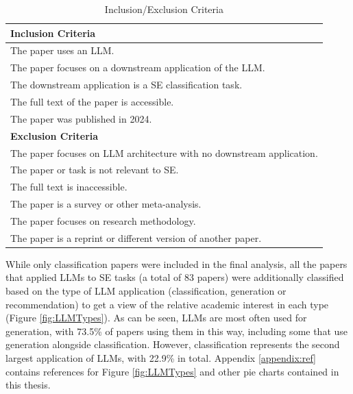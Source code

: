 \documentclass[a4paper]{article}
\begin{document}
\begin{table}[H]
	\caption{Inclusion/Exclusion Criteria}
	\begin{tabularx}{\textwidth}{|X|} \hline
		\textbf{Inclusion Criteria} \\ \hline
		The paper uses an LLM.  \\
		The paper focuses on a downstream application of the LLM. \\
		The downstream application is a SE classification task. \\
		The full text of the paper is accessible. \\
		The paper was published in 2024. \\ \hline
		\textbf{Exclusion Criteria} \\ \hline
		The paper focuses on LLM architecture with no downstream application. \\
		The paper or task is not relevant to SE. \\
		The full text is inaccessible. \\
		The paper is a survey or other meta-analysis. \\
		The paper focuses on research methodology. \\
		The paper is a reprint or different version of another paper. \\ \hline
	\end{tabularx}
	
	\label{table:criteria}
\end{table}

While only classification papers were included in the final analysis, all the papers that applied LLMs to SE tasks (a total of 83 papers) were additionally classified based on the type of LLM application (classification, generation or recommendation) to get a view of the relative academic interest in each type (Figure \ref{fig:LLMTypes}). As can be seen, LLMs are most often used for generation, with 73.5\% of papers using them in this way, including some that use generation alongside classification. However, classification represents the second largest application of LLMs, with 22.9\% in total. Appendix \ref{appendix:ref} contains references for Figure \ref{fig:LLMTypes} and other pie charts contained in this thesis.
\end{document}
